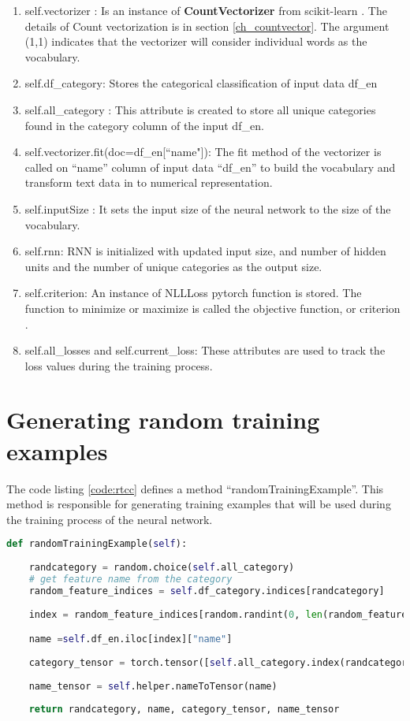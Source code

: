 \begin{enumerate}
    \item self.vectorizer : Is an instance of \textbf{CountVectorizer} from scikit-learn \parencite{sklearn_api}. The details of Count vectorization is in section \ref {ch_countvector}.  The argument (1,1) indicates that the vectorizer will consider individual words as the vocabulary.
    \item self.df\_category: Stores the categorical classification of input data df\_en
    \item self.all\_category : This attribute is created to store all unique categories found in the category column of the input df\_en.
    \item self.vectorizer.fit(doc=df\_en[``name"]): The fit method of the vectorizer is called on ``name'' column of input data ``df\_en'' to build the vocabulary and transform text data in to numerical representation.
    \item self.inputSize : It sets the input size of the neural network to the size of the vocabulary.
    \item self.rnn: \acl{RNN} is initialized with updated input size, and number of hidden units and the number of unique categories as the output size.
    \item self.criterion: An instance of \acf{NLLLoss} pytorch function is stored. The function to minimize or maximize is called the objective function, or criterion \parencite[Section 4.3]{Goodfellow-et-al-2016}.
    \item self.all\_losses and self.current\_loss: These attributes are used to track the loss values during the training process.
\end{enumerate}

\section{Generating random training examples}

The code listing \ref{code:rtcc} defines a method ``randomTrainingExample''. This method is responsible for generating training examples that will be used during the training process of the neural network.

\begin{lstlisting}[language=Python,caption={Train class constructor},label={code:rtcc}]
def randomTrainingExample(self):
    
    randcategory = random.choice(self.all_category)
    # get feature name from the category
    random_feature_indices = self.df_category.indices[randcategory]
    
    index = random_feature_indices[random.randint(0, len(random_feature_indices) - 1)]

    name =self.df_en.iloc[index]["name"]
    
    category_tensor = torch.tensor([self.all_category.index(randcategory)], dtype=torch.long)
    
    name_tensor = self.helper.nameToTensor(name)
    
    return randcategory, name, category_tensor, name_tensor
\end{lstlisting}

